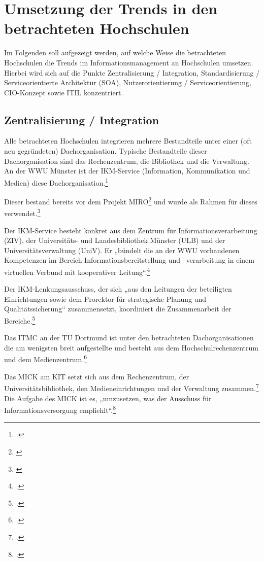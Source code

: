 \section{Umsetzung der Trends in den betrachteten Hochschulen}
\label{section_umsetzung_der_trends_in_den_betrachteten_hochschulen}
Im Folgenden soll aufgezeigt werden, auf welche Weise die betrachteten Hochschulen die Trends im Informationsmanagement an Hochschulen umsetzen. Hierbei wird sich auf die Punkte Zentralisierung / Integration, Standardisierung / Serviceorientierte Architektur (SOA), Nutzerorientierung / Serviceorientierung, CIO-Konzept sowie ITIL konzentriert.

\subsection{Zentralisierung / Integration}
\label{subsection_zentralisierung_integration}
Alle betrachteten Hochschulen integrieren mehrere Bestandteile unter einer (oft neu gegründeten) Dachorganisation. Typische Bestandteile dieser Dachorganisation sind das Rechenzentrum, die Bibliothek und die Verwaltung.
An der WWU Münster ist der IKM-Service (Information, Kommunikation und Medien) diese Dachorganisation.\footcite{wwu_ikm_2015}

Dieser bestand bereits vor dem Projekt MIRO\footnote{\cite[8]{vogl_bericht_2013}} und wurde als Rahmen für dieses verwendet.\footnote{\cite[47]{bode_informationsmanagement_2010}}

Der IKM-Service besteht konkret aus dem Zentrum für Informationsverarbeitung (ZIV), der Universitäts- und Landesbibliothek Münster (ULB) und der Universitätsverwaltung (UniV). Er „bündelt die an der WWU vorhandenen Kompetenzen im Bereich Informationsbereitstellung und –verarbeitung in einem virtuellen Verbund mit kooperativer Leitung“.\footcite{wwu_ikm_2015}

Der IKM-Lenkungsausschuss, der sich „aus den Leitungen der beteiligten Einrichtungen sowie dem Prorektor für strategische Planung und Qualitätssicherung“ zusammensetzt, koordiniert die Zusammenarbeit der Bereiche.\footcite{wwu_ikm_2015}

Das ITMC an der TU Dortmund ist unter den betrachteten Dachorganisationen die am wenigsten breit aufgestellte und besteht aus dem Hochschulrechenzentrum und dem Medienzentrum.\footcite{tu_dortmund_itmc_2015}

Das MICK am KIT setzt sich aus dem Rechenzentrum, der Universitätsbibliothek, den Medieneinrichtungen und der Verwaltung zusammen.\footcite{rummele_spaghetti_2006} Die Aufgabe des MICK ist es, „umzusetzen, was der Ausschuss für Informationsversorgung empfiehlt“.\footcite{rummele_spaghetti_2006}

